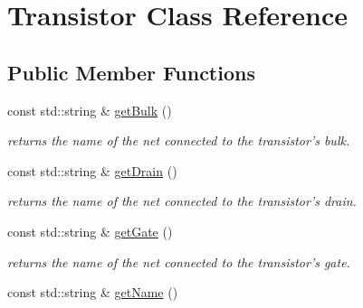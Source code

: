 \hypertarget{class_open_chams_1_1_transistor}{\section{Transistor Class Reference}
\label{class_open_chams_1_1_transistor}
}
\subsection*{Public Member Functions}
\begin{DoxyCompactItemize}
\item 
\hypertarget{class_open_chams_1_1_transistor_a27ba43f825f9243556ec65d306a2b1a7}{const std\-::string \& \hyperlink{class_open_chams_1_1_transistor_a27ba43f825f9243556ec65d306a2b1a7}{get\-Bulk} ()}\label{class_open_chams_1_1_transistor_a27ba43f825f9243556ec65d306a2b1a7}

\begin{DoxyCompactList}\small\item\em returns the name of the net connected to the transistor's bulk. \end{DoxyCompactList}\item 
\hypertarget{class_open_chams_1_1_transistor_a62ea0998b3a61310a8331873f5bcce58}{const std\-::string \& \hyperlink{class_open_chams_1_1_transistor_a62ea0998b3a61310a8331873f5bcce58}{get\-Drain} ()}\label{class_open_chams_1_1_transistor_a62ea0998b3a61310a8331873f5bcce58}

\begin{DoxyCompactList}\small\item\em returns the name of the net connected to the transistor's drain. \end{DoxyCompactList}\item 
\hypertarget{class_open_chams_1_1_transistor_a99f1449aa735ff6cb4927b4f6aa34d9d}{const std\-::string \& \hyperlink{class_open_chams_1_1_transistor_a99f1449aa735ff6cb4927b4f6aa34d9d}{get\-Gate} ()}\label{class_open_chams_1_1_transistor_a99f1449aa735ff6cb4927b4f6aa34d9d}

\begin{DoxyCompactList}\small\item\em returns the name of the net connected to the transistor's gate. \end{DoxyCompactList}\item 
\hypertarget{class_open_chams_1_1_transistor_a2858c0c4e8b5108f041237cf5a802029}{const std\-::string \& \hyperlink{class_open_chams_1_1_transistor_a2858c0c4e8b5108f041237cf5a802029}{get\-Name} ()}\label{class_open_chams_1_1_transistor_a2858c0c4e8b5108f041237cf5a802029}


\end{DoxyCompactItemize}
